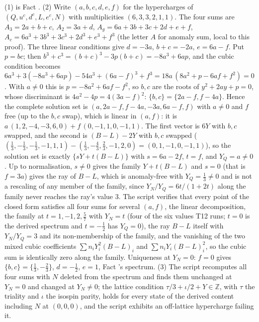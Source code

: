 (1) is Fact . (2) Write $(a, b, c, d, e, f)$ for the hypercharges of $(Q, u^{c}, d^{c}, L, e^{c}, N)$ with multiplicities $(6, 3, 3, 2, 1, 1)$. The four sums are $A_{3} = 2a + b + c$, $A_{2} = 3a + d$, $A_{g} = 6a + 3b + 3c + 2d + e + f$, $A_{c} = 6a^{3} + 3b^{3} + 3c^{3} + 2d^{3} + e^{3} + f^{3}$ (the letter $A$ for anomaly sum, local to this proof). The three linear conditions give $d = -3a$, $b + c = -2a$, $e = 6a - f$. Put $p = bc$; then $b^{3} + c^{3} = (b + c)^{3} - 3p(b + c) = -8a^{3} + 6ap$, and the cubic condition becomes $6a^{3} + 3(-8a^{3} + 6ap) - 54a^{3} + (6a - f)^{3} + f^{3} = 18a\,(8a^{2} + p - 6af + f^{2}) = 0$. With $a \neq 0$ this is $p = -8a^{2} + 6af - f^{2}$, so $b, c$ are the roots of $y^{2} + 2ay + p = 0$, whose discriminant is $4a^{2} - 4p = 4(3a - f)^{2}$: $\{b, c\} = \{2a - f, f - 4a\}$. Hence the complete solution set is $(a, 2a - f, f - 4a, -3a, 6a - f, f)$ with $a \neq 0$ and $f$ free (up to the $b, c$ swap), which is linear in $(a, f)$: it is $a\,(1, 2, -4, -3, 6, 0) + f\,(0, -1, 1, 0, -1, 1)$. The first vector is $6Y$ with $b, c$ swapped, and the second is $(B - L) - 2Y$ with $b, c$ swapped ($(\tfrac13, -\tfrac13, -\tfrac13, -1, 1, 1) - (\tfrac13, -\tfrac43, \tfrac23, -1, 2, 0) = (0, 1, -1, 0, -1, 1)$), so the solution set is exactly $\{sY + t(B - L)\}$ with $s = 6a - 2f$, $t = f$, and $Y_{Q} = a \neq 0$. Up to normalisation, $s \neq 0$ gives the family $Y + t(B - L)$ and $s = 0$ (that is $f = 3a$) gives the ray of $B - L$, which is anomaly-free with $Y_{Q} = \tfrac13 \neq 0$ and is not a rescaling of any member of the family, since $Y_{N}/Y_{Q} = 6t/(1 + 2t)$ along the family never reaches the ray's value $3$. The script verifies that every point of the closed form satisfies all four sums for several $(a, f)$, the linear decomposition, the family at $t = 1, -1, 2, \tfrac57$ with $Y_{N} = t$ (four of the six values T12 runs; $t = 0$ is the derived spectrum and $t = -\tfrac12$ has $Y_{Q} = 0$), the ray $B - L$ itself with $Y_{N}/Y_{Q} = 3$ and its non-membership of the family, and the vanishing of the two mixed cubic coefficients $\sum n_{i}Y_{i}^{2}(B - L)_{i}$ and $\sum n_{i}Y_{i}(B - L)_{i}^{2}$, so the cubic sum is identically zero along the family. Uniqueness at $Y_{N} = 0$: $f = 0$ gives $\{b, c\} = \{\tfrac13, -\tfrac23\}$, $d = -\tfrac12$, $e = 1$, Fact 's spectrum. (3) The script recomputes all four sums with $N$ deleted from the spectrum and finds them unchanged at $Y_{N} = 0$ and changed at $Y_{N} \neq 0$; the lattice condition $\tau/3 + \iota/2 + Y \in \mathbb{Z}$, with $\tau$ the triality and $\iota$ the isospin parity, holds for every state of the derived content including $N$ at $(0, 0, 0)$, and the script exhibits an off-lattice hypercharge failing it.
